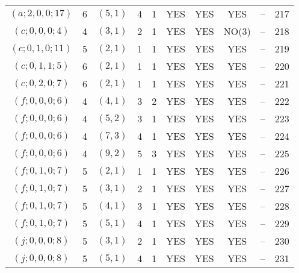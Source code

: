 \begin{longtable}{|c|c|c|c|c|c|c|c|c|c|}
$(a; 2, 0, 0; 17)$ & 6 & $(5, 1)$ & 4 & 1 & YES & YES & YES & -- & 217\\
$(c; 0, 0, 0; 4)$ & 4 & $(3, 1)$ & 2 & 1 & YES & YES & NO(3) & -- & 218\\
$(c; 0, 1, 0; 11)$ & 5 & $(2, 1)$ & 1 & 1 & YES & YES & YES & -- & 219\\
$(c; 0, 1, 1; 5)$ & 6 & $(2, 1)$ & 1 & 1 & YES & YES & YES & -- & 220\\
$(c; 0, 2, 0; 7)$ & 6 & $(2, 1)$ & 1 & 1 & YES & YES & YES & -- & 221\\
$(f; 0, 0, 0; 6)$ & 4 & $(4, 1)$ & 3 & 2 & YES & YES & YES & -- & 222\\
$(f; 0, 0, 0; 6)$ & 4 & $(5, 2)$ & 3 & 1 & YES & YES & YES & -- & 223\\
$(f; 0, 0, 0; 6)$ & 4 & $(7, 3)$ & 4 & 1 & YES & YES & YES & -- & 224\\
$(f; 0, 0, 0; 6)$ & 4 & $(9, 2)$ & 5 & 3 & YES & YES & YES & -- & 225\\
$(f; 0, 1, 0; 7)$ & 5 & $(2, 1)$ & 1 & 1 & YES & YES & YES & -- & 226\\
$(f; 0, 1, 0; 7)$ & 5 & $(3, 1)$ & 2 & 1 & YES & YES & YES & -- & 227\\
$(f; 0, 1, 0; 7)$ & 5 & $(4, 1)$ & 3 & 1 & YES & YES & YES & -- & 228\\
$(f; 0, 1, 0; 7)$ & 5 & $(5, 1)$ & 4 & 1 & YES & YES & YES & -- & 229\\
$(j; 0, 0, 0; 8)$ & 5 & $(3, 1)$ & 2 & 1 & YES & YES & YES & -- & 230\\
$(j; 0, 0, 0; 8)$ & 5 & $(5, 1)$ & 4 & 1 & YES & YES & YES & -- & 231
\end{longtable}
